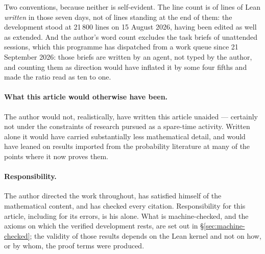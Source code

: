 Two conventions, because neither is self-evident. The line count is of lines of Lean \emph{written}
in those seven days, not of lines standing at the end of them: the development stood at 21\,800
lines on 15 August 2026, having been edited as well as extended. And the author's word count
excludes the task briefs of unattended sessions, which this programme has dispatched from a
work queue since 21 September 2026: those briefs are written by an agent, not typed by the
author, and counting them as direction would have inflated it by some four fifths and made
the ratio read as ten to one.

\paragraph{What this article would otherwise have been.} The author would not, realistically,
have written this article unaided --- certainly not under the constraints of research pursued
as a spare-time activity. Written alone it would have carried substantially less mathematical
detail, and would have leaned on results imported from the probability literature at many of
the points where it now proves them.

\paragraph{Responsibility.} The author directed the work throughout, has satisfied himself of
the mathematical content, and has checked every citation. Responsibility for this article,
including for its errors, is his alone. What is machine-checked, and the axioms on which the
verified development rests, are set out in \S\ref{sec:machine-checked}; the validity of those
results depends on the Lean kernel and not on how, or by whom, the proof terms were produced.
